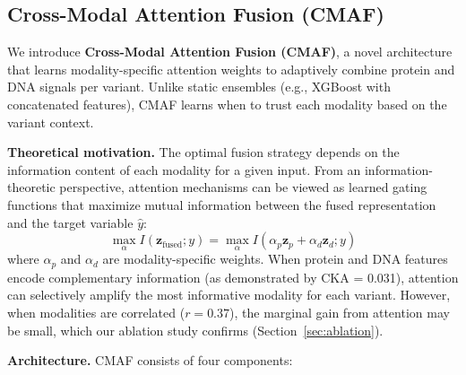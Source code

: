 \documentclass[9pt]{article}
\begin{document}
\subsection{Cross-Modal Attention Fusion (CMAF)}

We introduce \textbf{Cross-Modal Attention Fusion (CMAF)}, a novel architecture that learns modality-specific attention weights to adaptively combine protein and DNA signals per variant. Unlike static ensembles (e.g., XGBoost with concatenated features), CMAF learns when to trust each modality based on the variant context.

\textbf{Theoretical motivation.} The optimal fusion strategy depends on the information content of each modality for a given input. From an information-theoretic perspective, attention mechanisms can be viewed as learned gating functions that maximize mutual information between the fused representation and the target variable $\hat{y}$:
\begin{equation}
    \max_{\alpha} I(\mathbf{z}_{\text{fused}}; y) = \max_{\alpha} I(\alpha_p \mathbf{z}_p + \alpha_d \mathbf{z}_d; y)
    \label{eq:info}
\end{equation}
where $\alpha_p$ and $\alpha_d$ are modality-specific weights. When protein and DNA features encode complementary information (as demonstrated by CKA = 0.031), attention can selectively amplify the most informative modality for each variant. However, when modalities are correlated ($r = 0.37$), the marginal gain from attention may be small, which our ablation study confirms (Section~\ref{sec:ablation}).

\textbf{Architecture.} CMAF consists of four components:
\end{document}
